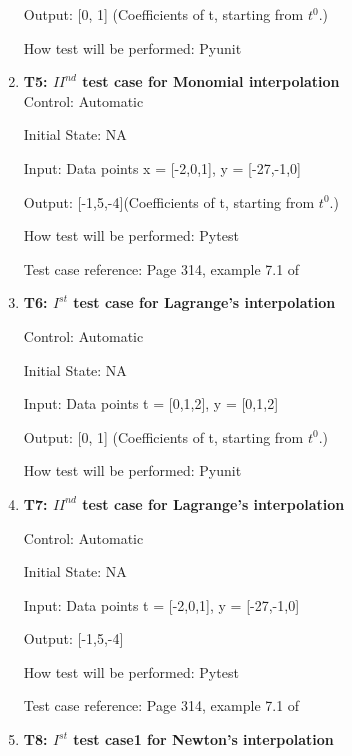 \documentclass[12pt, titlepage]{article}
\begin{document}
\begin{enumerate}
Output: [0, 1] (Coefficients of t, starting from $t^{0}$.)

How test will be performed: Pyunit\\




\item{\textbf{T5: ${II}^{nd}$ test case for Monomial interpolation}}\\

Control: Automatic
					
Initial State: NA
					
Input: Data points x = [-2,0,1], y = [-27,-1,0]

Output: [-1,5,-4](Coefficients of t, starting from $t^{0}$.)

How test will be performed: Pytest

Test case reference: Page 314, example 7.1 of ~\cite{Health1997}\\


					
\item{\textbf{T6: $I^{st}$ test case for Lagrange's interpolation} \\}

Control: Automatic 

Initial State: NA

Input: Data points t = [0,1,2], y = [0,1,2]

Output: [0, 1] (Coefficients of t, starting from $t^{0}$.)

How test will be performed: Pyunit\\



\item{\textbf{T7: ${II}^{nd}$ test case for Lagrange's interpolation} \\}


Control: Automatic

Initial State: NA

Input: Data points t = [-2,0,1], y = [-27,-1,0]

Output: [-1,5,-4]

How test will be performed: Pytest

Test case reference: Page 314, example 7.1 of  ~\cite{Health1997}\\


\item{\textbf{T8: $I^{st}$ test case1 for Newton's interpolation} \\}


\end{enumerate}
\end{document}
